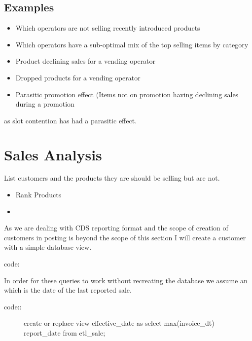 \documentclass[letterpaper,10pt,english]{sphinxmanual}
\begin{document}
\subsection{Examples}
\label{\detokenize{Answers:examples}}\begin{itemize}
\item {} 
Which operators are not selling recently introduced products

\item {} 
Which operators have a sub-optimal mix of the top selling items by category

\item {} 
Product declining sales for a vending operator

\item {} 
Dropped products for a vending operator

\item {} 
Parasitic promotion effect (Items not on promotion having declining sales during a promotion

\end{itemize}

as slot contention has had a parasitic effect.


\section{Sales Analysis}
\label{\detokenize{Answers:sales-analysis}}
List customers and the products they are should be selling but are not.
\begin{itemize}
\item {} 
Rank Products

\item {} 
\end{itemize}

As we are dealing with CDS reporting format and the scope of creation of customers in posting
is beyond the scope of this section I will create a customer with a simple database view.

code:

\begin{sphinxVerbatim}[commandchars=\\\{\}]
   
 
  
 
\end{sphinxVerbatim}

In order for these queries to work without recreating the database we assume
an  which is the date of the last reported sale.
\begin{description}
\item[{code::}] \leavevmode
create or replace view effective\_date as
select max(invoice\_dt) report\_date from etl\_sale;

\end{description}
\end{document}
